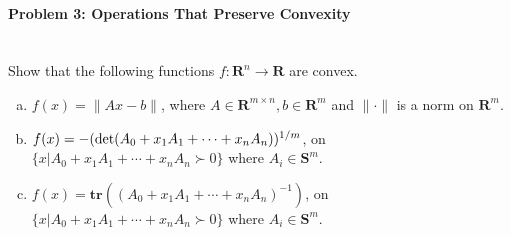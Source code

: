 \documentclass[a4paper]{article}
\begin{document}
\paragraph{Problem 3: Operations That Preserve Convexity}
~\\
Show that the following functions $f:\mathbf{R}^n\rightarrow\mathbf{R}$ are convex.
\begin{enumerate}[a)]
    \item $f(x)=\|{Ax-b}\|$, where $A\in \mathbf{R}^{m\times n}, b\in \mathbf{R}^{m}$ and $\|\cdot\|$ is a norm on $\mathbf{R}^{m}$.
    \item $f(x)=-(\textnormal{det}(A_0+x_1A_1+\cdots+x_nA_n))^{1/m}$, on $\{x|A_0+x_1A_1+\cdots+x_nA_n\succ 0\}$ where $A_i\in\mathbf{S}^m$.
    \item $f(x)=\mathbf{tr}((A_0+x_1A_1+\cdots+x_nA_n)^{-1})$, on $\{x|A_0+x_1A_1+\cdots+x_nA_n\succ 0\}$ where $A_i\in\mathbf{S}^m$.
\end{enumerate}
\end{document}
